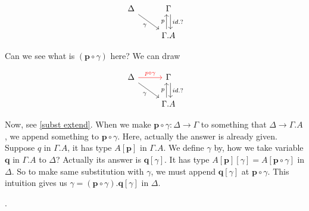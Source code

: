 \documentclass[12pt, letterpaper]{amsart}
\theoremstyle{definition}
\theoremstyle{remark}
\theoremstyle{plain}
\numberwithin{equation}{section}
\begin{document}
\[
\begin{tikzcd}
    \Delta  \arrow[rd, "\gamma"'] & \Gamma \arrow[d, "id.?", shift left]\\
    & \Gamma.A \arrow[u, "p", shift left]
\end{tikzcd}
\]

Can we see what is $(\mathbf{p} \circ \gamma)$ here? We can draw 

\[
\begin{tikzcd}
    \Delta \arrow[r, "p\circ \gamma", red] \arrow[rd, "\gamma"'] & \Gamma \arrow[d, "id.?", shift left]\\
    & \Gamma.A \arrow[u, "p", shift left]
\end{tikzcd}
\]

Now, see \ref{subst extend}. When we make $\mathbf{p} \circ \gamma : \Delta \rightarrow \Gamma$ to something that $\Delta \rightarrow \Gamma.A$, 
we append something to $\mathbf{p} \circ \gamma$. Here, actually the answer is already given. Suppose 
$q$ in $\Gamma.A$, it has type $A[\mathbf{p}]$ in $\Gamma.A$. We define $\gamma$ by, how we take variable $\mathbf{q}$ in $\Gamma.A$ to $\Delta$? 
Actually its answer is $\mathbf{q}[\gamma]$. It has type $A[\mathbf{p}][\gamma] = A[\mathbf{p} \circ \gamma]$ in $\Delta$. 
So to make same substitution with $\gamma$, we must append $\mathbf{q}[\gamma]$ at $\mathbf{p}\circ \gamma$. This intuition gives us $\gamma = (\mathbf{p}\circ \gamma).\mathbf{q}[\gamma]$ in $\Delta$. 

\newpage  
.
\end{document}
